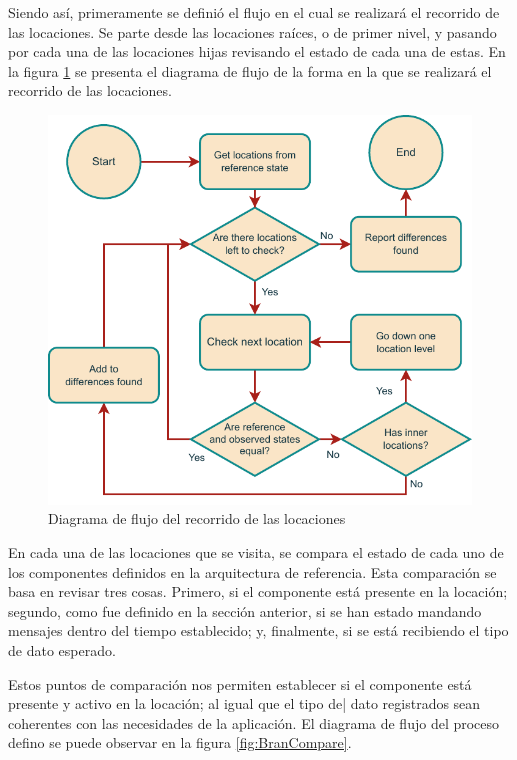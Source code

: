 Siendo así, primeramente se definió el flujo en el cual se realizará el recorrido de las locaciones. Se parte desde las locaciones raíces, o de primer nivel, y pasando por cada una de las locaciones hijas revisando el estado de cada una de estas. En la figura \ref{fig:BranProcess} se presenta el diagrama de flujo de la forma en la que se realizará el recorrido de las locaciones.

\begin{figure}[hb]
    \centering
    \caption{Diagrama de flujo del recorrido de las locaciones}
    \label{fig:BranProcess}
    \includegraphics[width=0.8\linewidth]{images/BranProcess.pdf}
\end{figure}

En cada una de las locaciones que se visita, se compara el estado de cada uno de los componentes definidos en la arquitectura de referencia. Esta comparación se basa en revisar tres cosas. Primero, si el componente está presente en la locación; segundo, como fue definido en la sección anterior, si se han estado mandando mensajes dentro del tiempo establecido; y, finalmente, si se está recibiendo el tipo de dato esperado.

Estos puntos de comparación nos permiten establecer si el componente está presente y activo en la locación; al igual que el tipo de| dato registrados sean coherentes con las necesidades de la aplicación. El diagrama de flujo del proceso defino se puede observar en la figura \ref{fig:BranCompare}.

